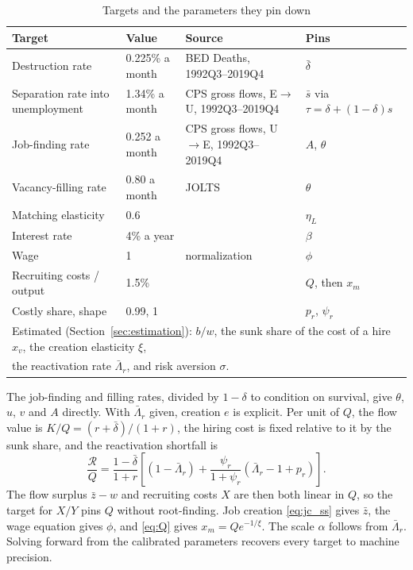 \documentclass[authoryear, review, 12pt]{elsarticle}
\begin{document}
\begin{table}[H]
\centering
\caption{Targets and the parameters they pin down}\label{tab:targets}
\small
\begin{tabular}{p{5.2cm}p{2.2cm}p{5.2cm}p{2.2cm}}
\toprule
Target & Value & Source & Pins \\
\midrule
Destruction rate & 0.225\% a month & BED Deaths, 1992Q3--2019Q4 & $\bar\delta$ \\
Separation rate into unemployment & 1.34\% a month & CPS gross flows, E$\to$U, 1992Q3--2019Q4 & $\bar s$ via $\tau=\delta+(1-\delta)s$ \\
Job-finding rate & 0.252 a month & CPS gross flows, U$\to$E, 1992Q3--2019Q4 & $A$, $\theta$ \\
Vacancy-filling rate & 0.80 a month & JOLTS & $\theta$ \\
Matching elasticity & 0.6 & \citet{petrongolo_2001} & $\eta_L$ \\
Interest rate & 4\% a year & & $\beta$ \\
Wage & 1 & normalization & $\phi$ \\
Recruiting costs / output & 1.5\% & & $Q$, then $x_m$ \\
Costly share, shape & 0.99, 1 & & $p_r$, $\psi_r$ \\
\midrule
\multicolumn{4}{l}{Estimated (Section~\ref{sec:estimation}): $b/w$, the sunk share of the cost of a hire $x_v$, the creation elasticity $\xi$,} \\
\multicolumn{4}{l}{the reactivation rate $\bar\Lambda_r$, and risk aversion $\sigma$.} \\
\bottomrule
\end{tabular}
\end{table}

The job-finding and filling rates, divided by $1-\delta$ to condition on survival, give $\theta$, $u$, $v$ and $A$ directly. With $\bar\Lambda_r$ given, creation $e$ is explicit. Per unit of $Q$, the flow value is $K/Q=(r+\bar\delta)/(1+r)$, the hiring cost is fixed relative to it by the sunk share, and the reactivation shortfall is
\begin{equation}
\frac{\mathcal{R}}{Q} = \frac{1-\bar\delta}{1+r}\left[(1-\bar\Lambda_r) + \frac{\psi_r}{1+\psi_r}(\bar\Lambda_r-1+p_r)\right].
\end{equation}
The flow surplus $\bar z-w$ and recruiting costs $X$ are then both linear in $Q$, so the target for $X/Y$ pins $Q$ without root-finding. Job creation \eqref{eq:jc_ss} gives $\bar z$, the wage equation gives $\phi$, and \eqref{eq:Q} gives $x_m=Qe^{-1/\xi}$. The scale $\alpha$ follows from $\bar\Lambda_r$. Solving forward from the calibrated parameters recovers every target to machine precision. %
\end{document}
